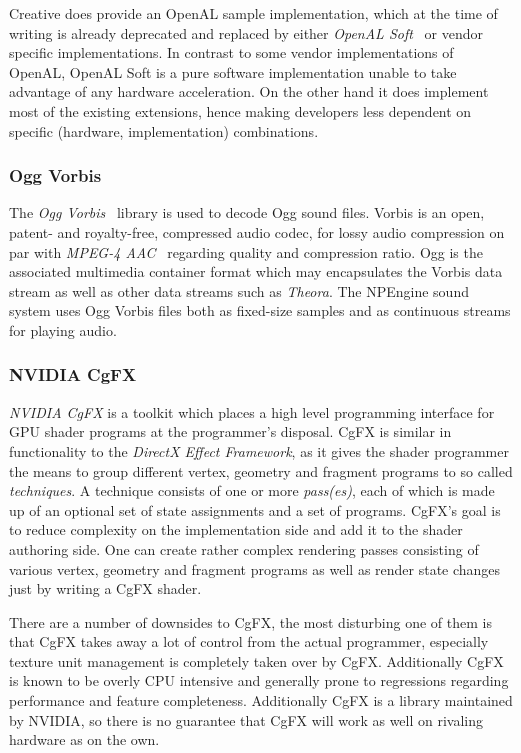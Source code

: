 Creative does provide an OpenAL sample implementation, which at the time of
writing is already deprecated and replaced by either \textit{OpenAL
Soft}~\cite{misc:openal-soft} or vendor specific implementations. In contrast to
some vendor implementations of OpenAL, OpenAL Soft is a pure software
implementation unable to take advantage of any hardware acceleration. On the
other hand it does implement most of the existing extensions, hence making
developers less dependent on specific (hardware, implementation) combinations.

\subsubsection{Ogg Vorbis}

The \textit{Ogg Vorbis}~\cite{misc:ogg-vorbis} library is used to decode Ogg
sound files. Vorbis is an open, patent- and royalty-free, compressed audio
codec, for lossy audio compression on par with \textit{MPEG-4
AAC}\cite{misc:mpeg-aac}~\cite{misc:mpeg-aac-standard} regarding quality and
compression ratio. Ogg is the associated multimedia container format which may
encapsulates the Vorbis data stream as well as other data streams such as
\textit{Theora}\cite{misc:ogg-theora}. The NPEngine sound system uses Ogg Vorbis
files both as fixed-size samples and as continuous streams for playing audio.

\subsubsection{NVIDIA CgFX}

\textit{NVIDIA CgFX}\cite{misc:nvcg} is a toolkit which places a high
level programming interface for GPU shader programs at the programmer's
disposal. CgFX is similar in functionality to the \textit{DirectX Effect
Framework}\cite{misc:directx}\cite{book:effect-hlsl}, as it gives the
shader programmer the means to group different vertex, geometry and fragment
programs to so called \textit{techniques}. A technique consists of one or more
\textit{pass(es)}, each of which is made up of an optional set of state
assignments and a set of programs. CgFX's goal is to reduce complexity on the
implementation side and add it to the shader authoring side. One can create
rather complex rendering passes consisting of various vertex, geometry and
fragment programs as well as render state changes just by writing a CgFX shader.

There are a number of downsides to CgFX, the most disturbing one of them is that
CgFX takes away a lot of control from the actual programmer, especially texture
unit management is completely taken over by CgFX. Additionally CgFX is known to
be overly CPU intensive and generally prone to regressions regarding performance
and feature completeness. Additionally CgFX is a library maintained by NVIDIA,
so there is no guarantee that CgFX will work as well on rivaling hardware as on
the own.

